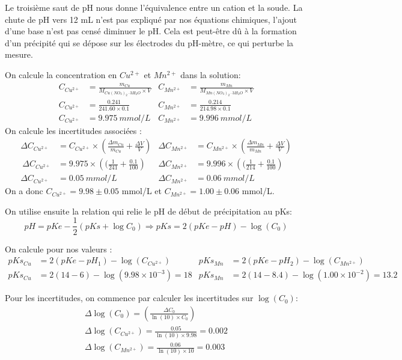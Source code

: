 \documentclass[12pt]{article}
\begin{document}
Le troisième saut de pH nous donne l'équivalence entre un cation et la soude. La chute de pH vers 12 mL n'est pas expliqué par nos équations chimiques, l'ajout d'une base n'est pas censé diminuer le pH. Cela est peut-être dû à la formation d'un précipité qui se dépose sur les électrodes du pH-mètre, ce qui perturbe la mesure. 

On calcule la concentration en $Cu^{2+}$ et $Mn^{2+}$ dans la solution:
\begin{align*}
C_{Cu^{2+}}&=\frac{m_{Cu}}{M_{Cu(NO_3)_2 \cdot 3 H_2O} \times V} & C_{Mn^{2+}}&=\frac{m_{Mn}}{M_{Mn(NO_3)_2 \cdot 3 H_2O}\times V} 
\\
C_{Cu^{2+}}&= \frac{0.241}{241.60 \times 0.1} & C_{Mn^{2+}}&= \frac{0.214}{214.98\times 0.1}
\\C_{Cu^{2+}}&=9.975 \ mmol/L & C_{Mn^{2+}}&=9.996 \ mmol/L
\end{align*}
On calcule les incertitudes associées :
\begin{align*}
\Delta C_{Cu^{2+}}&= C_{Cu^{2+}}\times \left(\frac{\Delta m_{Cu}}{m_{Cu}} + \frac{\Delta V}{V} \right) & 
\Delta C_{Mn^{2+}}&= C_{Mn^{2+}}\times \left(\frac{\Delta m_{Mn}}{m_{Mn}} + \frac{\Delta V}{V} \right)
\\\
\Delta C_{Cu^{2+}}&= 9.975 \times \left((\frac{1}{241} + \frac{0.1}{100}\right) & 
\Delta C_{Mn^{2+}}&= 9.996 \times \left((\frac{1}{214} + \frac{0.1}{100}\right) \\
\Delta C_{Cu^{2+}}&= 0.05 \ mmol/L & \Delta C_{Mn^{2+}}&=0.06 \ mmol/L
\end{align*}
On a donc $C_{Cu^{2+}}=9.98 \pm 0.05$ mmol/L et $C_{Mn^{2+}}=1.00 \pm 0.06$ mmol/L. 

On utilise ensuite la relation qui relie le pH de début de précipitation au pKs: 
\begin{equation}
pH=pKe- \frac{1}{2}(pKs + \log C_0) \Longrightarrow pKs=2(pKe - pH)- \log(C_0)
\end{equation}

On calcule pour nos valeurs :
\begin{align*}
pKs_{Cu}&= 2(pKe-pH_1)-\log(C_{Cu^{2+}}) & pKs_{Mn}&= 2(pKe-pH_2)-\log(C_{Mn^{2+}}) \\
pKs_{Cu}&= 2(14-6)-\log(9.98\times 10^{-3})=18 & pKs_{Mn}&=2(14-8.4)-\log(1.00\times 10^{-2})=13.2
\end{align*}

Pour les incertitudes, on commence par calculer les incertitudes sur $\log(C_0)$:
\begin{align*}
	\Delta \log(C_0) = \left(\frac{\Delta C_0}{\ln(10)\times C_0} \right) \\
	\Delta \log(C_{Cu^{2+}})= \frac{0.05}{\ln(10)\times 9.98 }= 0.002 \\
	\Delta \log(C_{Mn^{2+}})= \frac{0.06}{\ln(10)\times 10 }= 0.003
\end{align*}
\end{document}

